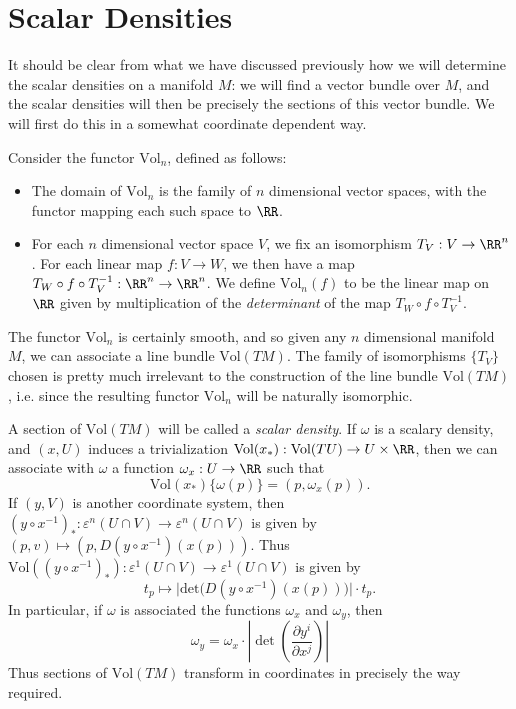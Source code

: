 \section{Scalar Densities}

It should be clear from what we have discussed previously how we will determine the scalar densities on a manifold $M$: we will find a vector bundle over $M$, and the scalar densities will then be precisely the sections of this vector bundle. We will first do this in a somewhat coordinate dependent way.

Consider the functor $\text{Vol}_n$, defined as follows:
%
\begin{itemize}
    \item The domain of $\text{Vol}_n$ is the family of $n$ dimensional vector spaces, with the functor mapping each such space to $\RR$.

    \item For each $n$ dimensional vector space $V$, we fix an isomorphism $T_V: V \to \RR^n$. For each linear map $f: V \to W$, we then have a map $T_W \circ f \circ T_V^{-1}: \RR^n \to \RR^n$. We define $\text{Vol}_n(f)$ to be the linear map on $\RR$ given by multiplication of the \emph{determinant} of the map $T_W \circ f \circ T_V^{-1}$. 
\end{itemize}
%
The functor $\text{Vol}_n$ is certainly smooth, and so given any $n$ dimensional manifold $M$, we can associate a line bundle $\text{Vol}(TM)$. The family of isomorphisms $\{ T_V \}$ chosen is pretty much irrelevant to the construction of the line bundle $\text{Vol}(TM)$, i.e. since the resulting functor $\text{Vol}_n$ will be naturally isomorphic.

A section of $\text{Vol}(TM)$ will be called a \emph{scalar density}. If $\omega$ is a scalary density, and $(x,U)$ induces a trivialization $\text{Vol}(x_*): \text{Vol}(TU) \to U \times \RR$, then we can associate with $\omega$ a function $\omega_x: U \to \RR$ such that
%
\[ \text{Vol}(x_*) \{ \omega(p) \} = (p, \omega_x(p)). \]
%
If $(y,V)$ is another coordinate system, then $(y \circ x^{-1})_*: \varepsilon^n(U \cap V) \to \varepsilon^n(U \cap V)$ is given by $(p,v) \mapsto (p, D(y \circ x^{-1})(x(p)))$. Thus $\text{Vol}((y \circ x^{-1})_*): \varepsilon^1(U \cap V) \to \varepsilon^1(U \cap V)$ is given by
%
\[ t_p \mapsto \Big| \text{det} \big( D(y \circ x^{-1})(x(p)) \big) \Big| \cdot t_p. \]
%
In particular, if $\omega$ is associated the functions $\omega_x$ and $\omega_y$, then
%
\[ \omega_y = \omega_x \cdot \left| \det \left( \frac{\partial y^i}{\partial x^j} \right) \right| \]
%
Thus sections of $\text{Vol}(TM)$ transform in coordinates in precisely the way required.

